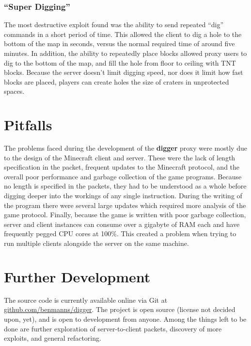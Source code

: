 \documentclass[12pt]{article}
\begin{document}
\subsubsection{``Super Digging''}
The most destructive exploit found was the ability to send repeated ``dig'' commands in a short period of time. This allowed the client to dig a hole to the bottom of the map in seconds, versus the normal required time of around five minutes. In addition, the ability to repeatedly place blocks allowed proxy users to dig to the bottom of the map, and fill the hole from floor to ceiling with TNT blocks. Because the server doesn't limit digging speed, nor does it limit how fast blocks are placed, players can create holes the size of craters in unprotected spaces.

\section{Pitfalls}
The problems faced during the development of the \textbf{digger} proxy were mostly due to the design of the Minecraft client and server. These were the lack of length specification in the packet, frequent updates to the Minecraft protocol, and the overall poor performance and garbage collection of the game programs. Because no length is specified in the packets, they had to be understood as a whole before digging deeper into the workings of any single instruction. During the writing of the program there were several large updates which required more analysis of the game protocol. Finally, because the game is written with poor garbage collection, server and client instances can consume over a gigabyte of RAM each and have frequently pegged CPU cores at 100\%. This created a problem when trying to run multiple clients alongside the server on the same machine.

\section{Further Development}
The source code is currently available online via Git at \href{https://github.com/benmanns/digger}{github.com/benmanns/digger}. The project is open source (license not decided upon, yet), and is open to development from anyone. Among the things left to be done are further exploration of server-to-client packets, discovery of more exploits, and general refactoring.
\end{document}
